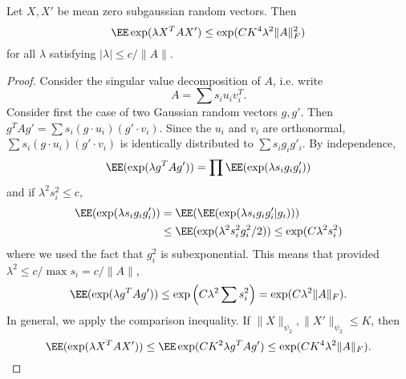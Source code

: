 \begin{lemma}
    Let $X,X'$ be mean zero subgaussian random vectors. Then
    \[ \EE \exp(\lambda X^TAX') \leq \exp(C K^4 \lambda^2 \| A \|_F^2) \]
    for all $\lambda$ satisfying $|\lambda| \leq c/\|A\|$.
\end{lemma}
\begin{proof}
    Consider the singular value decomposition of $A$, i.e. write
    \[ A = \sum s_i u_i v_i^T. \]
    Consider first the case of two Gaussian random vectors $g,g'$. Then $g^T Ag' = \sum s_i (g \cdot u_i)(g' \cdot v_i)$. Since the $u_i$ and $v_i$ are orthonormal, $\sum s_i (g \cdot u_i)(g' \cdot v_i)$ is identically distributed to $\sum s_i g_i g'_i$. By independence,
    \[ \EE(\exp(\lambda g^T A g')) = \prod \EE(\exp(\lambda s_i g_i g'_i)) \]
    and if $\lambda^2 s_i^2 \leq c$,
    \begin{align*}
        \EE(\exp(\lambda s_i g_i g'_i)) &= \EE(\EE(\exp(\lambda s_i g_i g'_i | g_i)))\\
        &\leq \EE(\exp(\lambda^2 s_i^2 g_i^2/2)) \leq \exp(C \lambda^2 s_i^2)
    \end{align*}
    where we used the fact that $g_i^2$ is subexponential. This means that provided $\lambda^2 \leq c / \max s_i = c / \| A \|$,
    \[ \EE(\exp(\lambda g^T A g')) \leq \exp \left( C \lambda^2 \sum s_i^2 \right) = \exp(C \lambda^2 \| A \|_F). \]
    In general, we apply the comparison inequality. If $\| X \|_{\psi_2}, \| X' \|_{\psi_2} \leq K$, then
    \[ \EE(\exp(\lambda X^T A X')) \leq \EE \exp(C K^2 \lambda g^T A g') \leq \exp(C K^4 \lambda^2 \| A \|_F). \qedhere \]
\end{proof}

